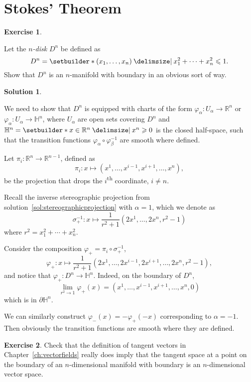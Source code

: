 \documentclass[11pt, a4paper]{report}
\theoremstyle{definition}
\newtheorem{exercise}{Exercise}[part]
\newtheorem{solution}{Solution}[part]
\newenvironment{ex}{\begin{exercise}}{\end{exercise}\pagebreak[1]}
\newenvironment{sol}{\begin{solution}}{\end{solution}\pagebreak[3]}
\renewcommand{\leq}{\leqslant}
\renewcommand{\geq}{\geqslant}
\begin{document}
\section{Stokes' Theorem}

\begin{ex}\label{ex:ndisk}

Let the \emph{$n$-disk} $D^n$ be defined as
\[
    D^n = \setbuilder*{(x_1, \ldots, x_n) \given x_1^2 + \cdots + x_n^2 \leq 1}.
\]
Show that $D^n$ is an $n$-manifold with boundary in an obvious sort of way.

\end{ex}

\begin{sol}\label{sol:ndisk}

We need to show that $D^n$ is equipped with charts of the form $\varphi_\alpha: U_\alpha \to \mathbb{R}^n$ or $\varphi_\alpha: U_\alpha \to \mathbb{H}^n$, where $U_\alpha$ are open sets covering $D^n$ and $\mathbb{H}^n = \setbuilder*{x \in \mathbb{R}^n \given x^n \geq 0}$ is the closed half-space, such that the transition functions $\varphi_\alpha \circ \varphi_\beta^{-1}$ are smooth where defined.

Let $\pi_i: \mathbb{R}^{n} \to \mathbb{R}^{n - 1}$, defined as
\[
    \pi_i: x \mapsto (x^1, \ldots, x^{i - 1}, x^{i + 1}, \ldots, x^{n}),
\]
be the projection that drops the $i$\textsuperscript{th} coordinate, $i \neq n$.

Recall the inverse stereographic projection from solution~\ref{sol:stereographicprojection} with $\alpha = 1$, which we denote as
\[
    \sigma_+^{-1}: x \mapsto \frac{1}{r^2 + 1} (2x^1, \ldots, 2x^n, r^2 - 1)
\]
where $r^2 = x_1^2 + \cdots + x_n^2$.

Consider the composition $\varphi_+ = \pi_i \circ \sigma_+^{-1}$,
\[
    \varphi_+: x \mapsto \frac{1}{r^2 + 1} (2x^1, \ldots, 2x^{i - 1}, 2x^{i + 1}, \ldots, 2x^n, r^2 - 1),
\]
and notice that $\varphi_+: D^n \to \mathbb{H}^n$. Indeed, on the boundary of $D^n$,
\[
    \lim_{r^2 \to 1} \varphi_+(x) = (x^1, \ldots, x^{i - 1}, x^{i + 1}, \ldots, x^n, 0)
\]
which is in $\partial \mathbb{H}^n$.

We can similarly construct $\varphi_-(x) = -\varphi_+(-x)$ corresponding to $\alpha = -1$. Then obviously the transition functions are smooth where they are defined.

\end{sol}

\begin{ex}

Check that the definition of tangent vectors in Chapter~\ref{ch:vectorfields} really does imply that the tangent space at a point on the boundary of an $n$-dimensional manifold with boundary is an $n$-dimensional vector space.

\end{ex}
\end{document}
